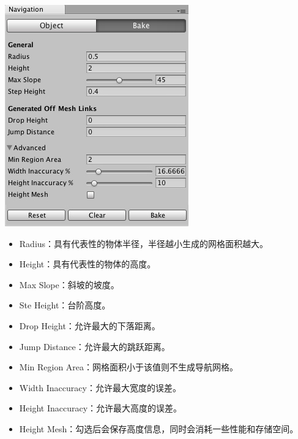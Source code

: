 \documentclass[9pt, b5paper]{article}
\begin{document}
\begin{center}
\includegraphics[width=.9\linewidth]{./pic/baking.jpg}
\end{center}
\begin{itemize}
\item Radius：具有代表性的物体半径，半径越小生成的网格面积越大。
\item Height：具有代表性的物体的高度。
\item Max Slope：斜坡的坡度。
\item Ste Height：台阶高度。
\item Drop Height：允许最大的下落距离。
\item Jump Distance：允许最大的跳跃距离。
\item Min Region Area：网格面积小于该值则不生成导航网格。
\item Width Inaccuracy：允许最大宽度的误差。
\item Height Inaccuracy：允许最大高度的误差。
\item Height Mesh：勾选后会保存高度信息，同时会消耗一些性能和存储空间。
\end{itemize}
\end{document}
